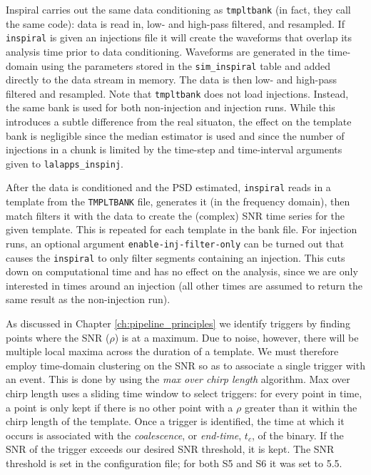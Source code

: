 Inspiral carries out the same data conditioning as \texttt{tmpltbank} (in fact, they call the same code): data is read in, low- and high-pass filtered, and resampled. If \texttt{inspiral} is given an injections file it will create the waveforms that overlap its analysis time prior to data conditioning. Waveforms are generated in the time-domain using the parameters stored in the \texttt{sim\_inspiral} table and added directly to the data stream in memory. The data is then low- and high-pass filtered and resampled. Note that \texttt{tmpltbank} does not load injections. Instead, the same bank is used for both non-injection and injection runs. While this introduces a subtle difference from the real situaton, the effect on the template bank is negligible since the median estimator is used and since the number of injections in a chunk is limited by the time-step and time-interval arguments given to \texttt{lalapps\_inspinj}.

After the data is conditioned and the \ac{PSD} estimated, \texttt{inspiral} reads in a template from the \texttt{TMPLTBANK} file, generates it (in the frequency domain), then match filters it with the data to create the (complex) \ac{SNR} time series for the given template. This is repeated for each template in the bank file. For injection runs, an optional argument \texttt{enable-inj-filter-only} can be turned out that causes the \texttt{inspiral} to only filter segments containing an injection. This cuts down on computational time and has no effect on the analysis, since we are only interested in times around an injection (all other times are assumed to return the same result as the non-injection run).

As discussed in Chapter \ref{ch:pipeline_principles} we identify triggers by finding points where the \ac{SNR} ($\rho$) is at a maximum. Due to noise, however, there will be multiple local maxima across the duration of a template. We must therefore employ time-domain clustering on the \ac{SNR} so as to associate a single trigger with an event. This is done by using the \emph{max over chirp length} algorithm. Max over chirp length uses a sliding time window to select triggers: for every point in time, a point is only kept if there is no other point with a $\rho$ greater than it within the chirp length of the template. Once a trigger is identified, the time at which it occurs is associated with the \emph{coalescence}, or \emph{end-time}, $t_c$, of the binary. If the \ac{SNR} of the trigger exceeds our desired \ac{SNR} threshold, it is kept. The \ac{SNR} threshold is set in the configuration file; for both \ac{S5} and \ac{S6} it was set to 5.5.

